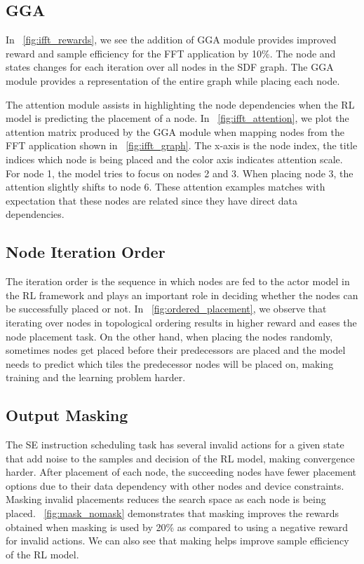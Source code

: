 \subsection{GGA} \label{sec:GGA_result}

In \figurename~\ref{fig:ifft_rewards}, we see the addition of GGA module provides improved reward and sample efficiency for the FFT application by 10\%. 
The node and states changes for each iteration over all nodes in the SDF graph. The GGA module provides a representation of the entire graph while placing each node.

The attention module assists in highlighting the node dependencies when the RL model is predicting the placement of a node. 
In \figurename~\ref{fig:ifft_attention}, we plot the attention matrix produced by the GGA module when mapping nodes from the FFT application shown in \figurename~\ref{fig:ifft_graph}. 
The x-axis is the node index, the title indices which node is being placed and the color axis indicates attention scale.
For node 1, the model tries to focus on nodes 2 and 3. When placing node 3, the attention slightly shifts to node 6. 
These attention examples matches with expectation that these nodes are related since they have direct data dependencies. 

\subsection{Node Iteration Order}

The iteration order is the sequence in which nodes are fed to the actor model in the RL framework and plays an important role in deciding whether the nodes can be successfully placed or not. 
In \figurename~\ref{fig:ordered_placement}, we observe that iterating over nodes in topological ordering results in higher reward and eases the node placement task. 
On the other hand, when placing the nodes randomly, sometimes nodes get placed before their predecessors are placed and the model needs to predict which tiles the predecessor nodes will be placed on, making training and the learning problem harder.

\subsection{Output Masking}
\label{subsec:output_masking}
The SE instruction scheduling task has several invalid actions for a given state that add noise to the samples and decision of the RL model, making convergence harder. 
After placement of each node, the succeeding nodes have fewer placement options due to their data dependency with other nodes and device constraints.
Masking invalid placements reduces the search space as each node is being placed. 
\figurename~\ref{fig:mask_nomask} demonstrates that masking improves the rewards obtained when masking is used by 20\% as compared to using a negative reward for invalid actions. We can also see that making helps improve sample efficiency of the RL model.

